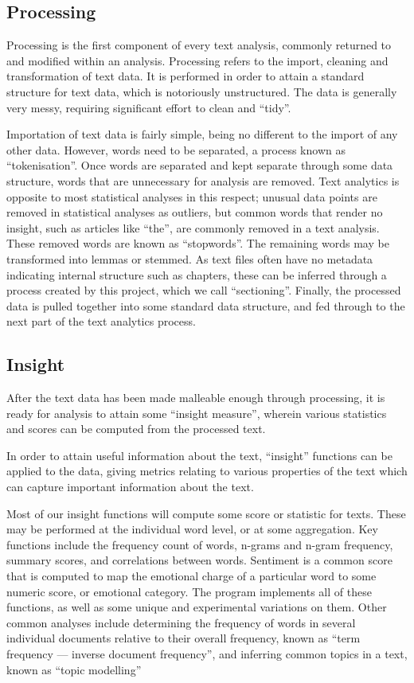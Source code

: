 \message{ !name(jason-cairns-dissertation.tex)}\documentclass[11pt, a4paper, titlepage]{report}
\begin{document}
\subsection{Processing}\label{sec:processing}

Processing is the first component of every text analysis, commonly
returned to and modified within an analysis. Processing refers to the
import, cleaning and transformation of text data. It is performed in
order to attain a standard structure for text data, which is
notoriously unstructured. The data is generally very messy, requiring
significant effort to clean and ``tidy''.

Importation of text data is fairly simple, being no different to the
import of any other data. However, words need to be separated, a
process known as ``tokenisation''. Once words are separated and
kept separate through some data structure, words that are unnecessary
for analysis are removed. Text analytics is opposite to most
statistical analyses in this respect; unusual data points are removed
in statistical analyses as outliers, but common words that render no
insight, such as articles like ``the'', are commonly removed in a text
analysis. These removed words are known as ``stopwords''. The
remaining words may be transformed into lemmas or stemmed. As text
files often have no metadata indicating internal structure such as
chapters, these can be inferred through a process created by this
project, which we call ``sectioning''. Finally, the processed data is pulled
together into some standard data structure, and fed through to the next
part of the text analytics process.

\subsection{Insight}\label{sec:insight-1}

After the text data has been made malleable enough through processing,
it is ready for analysis to attain some ``insight measure'', wherein
various statistics and scores can be computed from the processed text.

In order to attain useful information about the text, ``insight''
functions can be applied to the data, giving metrics relating to
various properties of the text which can capture important information
about the text.

Most of our insight functions will compute some score or statistic for texts.
These may be performed at the individual word level, or at some
aggregation. Key functions include the frequency count of words,
n-grams and n-gram frequency, summary scores, and correlations between
words. Sentiment is a common score that is computed to map the
emotional charge of a particular word to some numeric score, or
emotional category. The program implements all of these functions, as
well as some unique and experimental variations on them. Other common
analyses include determining the frequency of words in several
individual documents relative to their overall frequency, known as
``term frequency --- inverse document frequency'', and inferring
common topics in a text, known as ``topic modelling''
\end{document}
